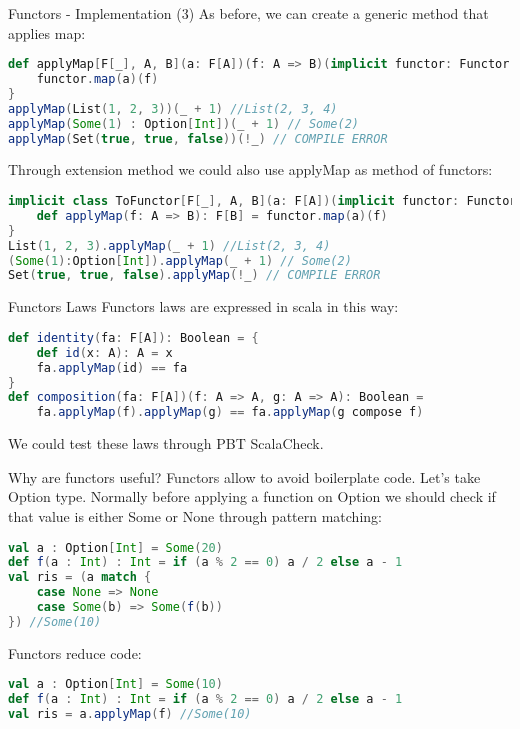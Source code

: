 \begin{frame}[fragile]{Functors - Implementation (3)}			
	As before, we can create a generic method that applies map:
\begin{lstlisting}[language=scala]
def applyMap[F[_], A, B](a: F[A])(f: A => B)(implicit functor: Functor[F]): F[B] = {
	functor.map(a)(f)
}
applyMap(List(1, 2, 3))(_ + 1) //List(2, 3, 4)
applyMap(Some(1) : Option[Int])(_ + 1) // Some(2)
applyMap(Set(true, true, false))(!_) // COMPILE ERROR
\end{lstlisting}	
	Through extension method we could also use applyMap as method of functors:
\begin{lstlisting}[language=scala]
implicit class ToFunctor[F[_], A, B](a: F[A])(implicit functor: Functor[F]) {
	def applyMap(f: A => B): F[B] = functor.map(a)(f)
}
List(1, 2, 3).applyMap(_ + 1) //List(2, 3, 4)
(Some(1):Option[Int]).applyMap(_ + 1) // Some(2)
Set(true, true, false).applyMap(!_) // COMPILE ERROR
\end{lstlisting}	
\end{frame}

\begin{frame}[fragile]{Functors Laws}
	Functors laws are expressed in scala in this way:
\begin{lstlisting}[language=scala]
def identity(fa: F[A]): Boolean = {
	def id(x: A): A = x	
	fa.applyMap(id) == fa
}
def composition(fa: F[A])(f: A => A, g: A => A): Boolean =
	fa.applyMap(f).applyMap(g) == fa.applyMap(g compose f)
\end{lstlisting}	
	We could test these laws through PBT ScalaCheck.
\end{frame}

\begin{frame}[fragile]{Why are functors useful?}
	Functors allow to avoid boilerplate code.
	Let's take Option type. 
	Normally before applying a function on Option we should check if that value is either Some or None through pattern matching:
\begin{lstlisting}[language=scala]
val a : Option[Int] = Some(20)
def f(a : Int) : Int = if (a % 2 == 0) a / 2 else a - 1
val ris = (a match {
	case None => None
	case Some(b) => Some(f(b))
}) //Some(10)
\end{lstlisting}	
	
	Functors reduce code:
\begin{lstlisting}[language=scala]
val a : Option[Int] = Some(10)
def f(a : Int) : Int = if (a % 2 == 0) a / 2 else a - 1
val ris = a.applyMap(f) //Some(10)
\end{lstlisting}
\end{frame}